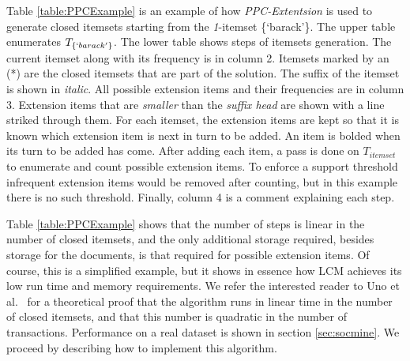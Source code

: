 \documentclass{sig-alternate}
\begin{document}
Table \ref{table:PPCExample} is an example of how \emph{PPC-Extentsion} is
used to generate closed itemsets starting from the
\emph{1}-itemset \{`barack'\}.
The upper table enumerates $T_{\{`barack'\}}$.
The lower table shows steps of itemsets generation.
The current itemset along with its frequency is in column 2.
Itemsets marked by an (*) are the closed itemsets that are part of the solution.
The suffix of the itemset is shown in \emph{italic}. 
All possible extension items and their frequencies are in column 3. 
Extension items that are \emph{smaller} than the \emph{suffix head} 
are shown with a line striked through them. 
For each itemset, the extension items are kept 
so that it is known which extension item 
is next in turn to be added.
An item is bolded when its turn to be added has come.
After adding each item, a pass is done on $T_{itemset}$ to 
enumerate and count possible extension items.
To enforce a support threshold infrequent extension items would be removed
after counting, %
but in this example there is no such threshold.
Finally, column 4 is a comment explaining each step.

Table \ref{table:PPCExample} shows that the number of steps is linear in the number of closed itemsets,
and the only additional storage required, besides storage for the documents,
is that required for possible extension items.
Of course, this is a simplified example, but it shows in essence how LCM
achieves its low run time and memory requirements.
We refer the interested reader to Uno et al.~\cite{uno2004lcm} for a
theoretical proof that the algorithm runs in linear time in the number of
closed itemsets,
and that this number is quadratic in the number of transactions.
Performance on a real dataset is shown in section \ref{sec:socmine}.
We proceed by describing how to implement this algorithm. 


\end{document}
